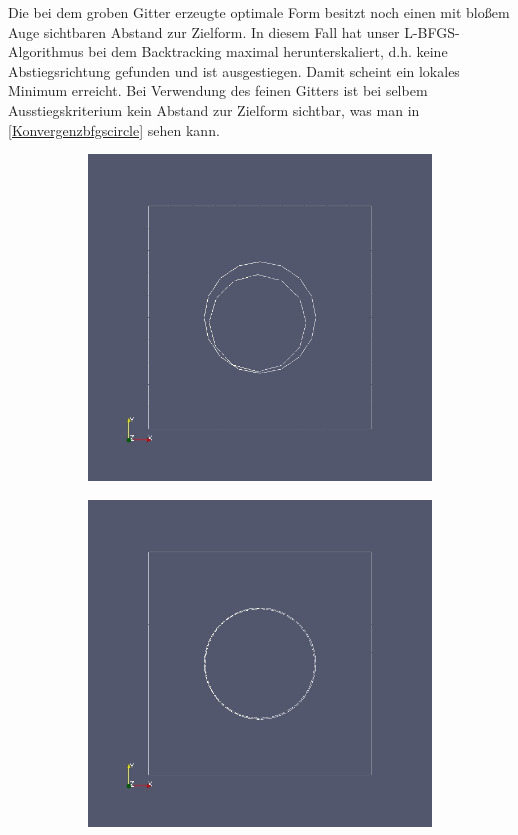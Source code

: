 Die bei dem groben Gitter erzeugte optimale Form besitzt noch einen mit bloßem Auge sichtbaren Abstand zur Zielform. In diesem Fall hat unser L-BFGS-Algorithmus bei dem Backtracking maximal herunterskaliert, d.h. keine Abstiegsrichtung gefunden und ist ausgestiegen. Damit scheint ein lokales Minimum erreicht. Bei Verwendung des feinen Gitters ist bei selbem Ausstiegskriterium kein Abstand zur Zielform sichtbar, was man in \ref{Konvergenzbfgscircle} sehen kann.

\begin{figure}
	\begin{subfigure}{0.5\textwidth}
	\centering
	\includegraphics[scale=0.25]{pic_bigcircle_bfgs_linesearch.jpg}
	\caption{}	
	\end{subfigure}
	\begin{subfigure}{0.5\textwidth}
	\centering
	\includegraphics[scale=0.25]{pic_bigcircle_bfgs_linesearch_fine.jpg}

\end{subfigure}
\end{figure}
